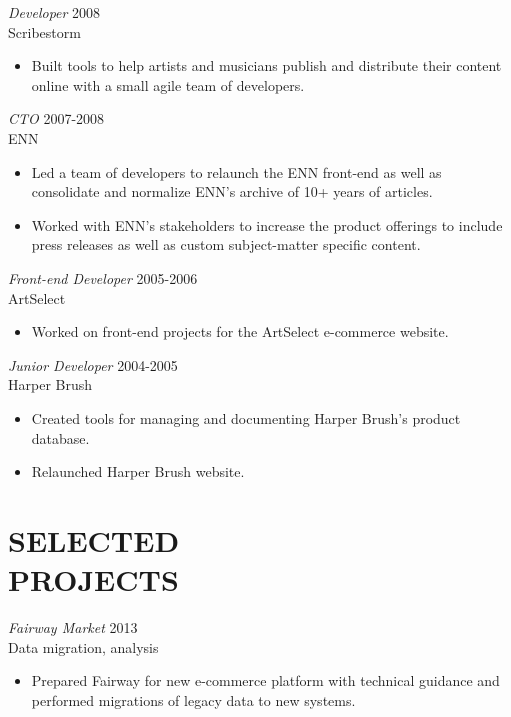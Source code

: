 \documentclass[line,margin]{res}
\begin{document}
\begin{resume}
    \begin{samepage}
    {\sl Developer}
    \hfill 2008 \\
    Scribestorm
    \begin{itemize} \itemsep -2pt
        \item
            Built tools to help artists and musicians publish and distribute
            their content online with a small agile team of developers.

    \end{itemize}
    \end{samepage}

    {\sl CTO}
    \hfill 2007-2008 \\
    ENN
    \begin{itemize} \itemsep -2pt
        \item
            Led a team of developers to relaunch the ENN front-end as well as
            consolidate and normalize ENN's archive of 10+ years of articles.

        \item
            Worked with ENN's stakeholders to increase the product offerings
            to include press releases as well as custom subject-matter
            specific content.

    \end{itemize}

    {\sl Front-end Developer}
    \hfill 2005-2006 \\
    ArtSelect
    \begin{itemize} \itemsep -2pt
        \item
            Worked on front-end projects for the ArtSelect e-commerce website.

    \end{itemize}

    {\sl Junior Developer}
    \hfill 2004-2005 \\
    Harper Brush
    \begin{itemize} \itemsep -2pt
        \item
            Created tools for managing and documenting Harper Brush's product
            database.

        \item
            Relaunched Harper Brush website.

    \end{itemize}



\section{SELECTED \\ PROJECTS}
    {\sl Fairway Market}
    \hfill 2013 \\
    Data migration, analysis
    \begin{itemize} \itemsep -2pt
        \item
            Prepared Fairway for new e-commerce platform with technical
            guidance and performed migrations of legacy data to new systems.


\end{itemize}
\end{resume}
\end{document}
